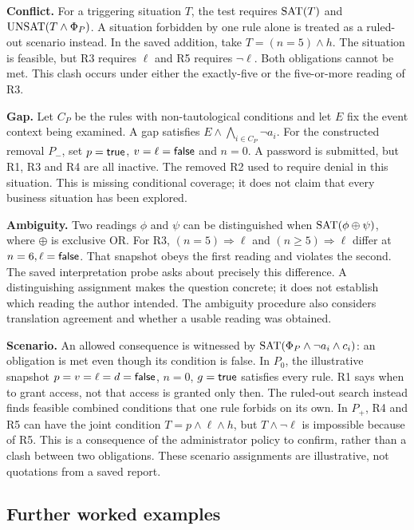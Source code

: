 \textbf{Conflict.} For a triggering situation $T$, the test requires $\operatorname{SAT}(T)$ and $\operatorname{UNSAT}(T\land\Phi_P)$. A situation forbidden by one rule alone is treated as a ruled-out scenario instead. In the saved addition, take $T=(n=5)\land h$. The situation is feasible, but R3 requires $\ell$ and R5 requires $\neg\ell$. Both obligations cannot be met. This clash occurs under either the exactly-five or the five-or-more reading of R3.

\textbf{Gap.} Let $C_P$ be the rules with non-tautological conditions and let $E$ fix the event context being examined. A gap satisfies $E\land\bigwedge_{i\in C_P}\neg a_i$. For the constructed removal $P_-$, set $p=\mathsf{true}$, $v=\ell=\mathsf{false}$ and $n=0$. A password is submitted, but R1, R3 and R4 are all inactive. The removed R2 used to require denial in this situation. This is missing conditional coverage; it does not claim that every business situation has been explored.

\textbf{Ambiguity.} Two readings $\phi$ and $\psi$ can be distinguished when $\operatorname{SAT}(\phi\mathbin{\oplus}\psi)$, where $\oplus$ is exclusive OR. For R3, $(n=5)\Rightarrow\ell$ and $(n\ge5)\Rightarrow\ell$ differ at $n=6,\ell=\mathsf{false}$. That snapshot obeys the first reading and violates the second. The saved interpretation probe asks about precisely this difference. A distinguishing assignment makes the question concrete; it does not establish which reading the author intended. The ambiguity procedure also considers translation agreement and whether a usable reading was obtained.

\textbf{Scenario.} An allowed consequence is witnessed by $\operatorname{SAT}(\Phi_P\land\neg a_i\land c_i)$: an obligation is met even though its condition is false. In $P_0$, the illustrative snapshot $p=v=\ell=d=\mathsf{false}$, $n=0$, $g=\mathsf{true}$ satisfies every rule. R1 says when to grant access, not that access is granted only then. The ruled-out search instead finds feasible combined conditions that one rule forbids on its own. In $P_+$, R4 and R5 can have the joint condition $T=p\land\ell\land h$, but $T\land\neg\ell$ is impossible because of R5. This is a consequence of the administrator policy to confirm, rather than a clash between two obligations. These scenario assignments are illustrative, not quotations from a saved report.

\subsection{Further worked examples}

